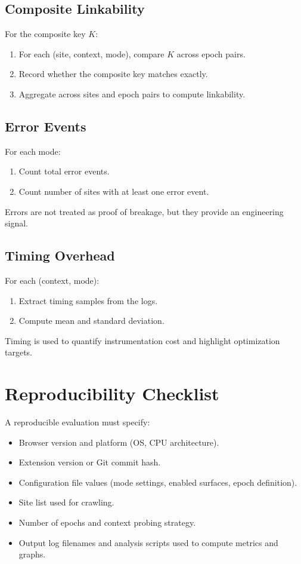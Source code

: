 \documentclass[11pt]{report}
\begin{document}
\subsection{Composite Linkability}

For the composite key $K$:
\begin{enumerate}
    \item For each (site, context, mode), compare $K$ across epoch pairs.
    \item Record whether the composite key matches exactly.
    \item Aggregate across sites and epoch pairs to compute linkability.
\end{enumerate}

\subsection{Error Events}

For each mode:
\begin{enumerate}
    \item Count total error events.
    \item Count number of sites with at least one error event.
\end{enumerate}

Errors are not treated as proof of breakage, but they provide an engineering signal.

\subsection{Timing Overhead}

For each (context, mode):
\begin{enumerate}
    \item Extract timing samples from the logs.
    \item Compute mean and standard deviation.
\end{enumerate}

Timing is used to quantify instrumentation cost and highlight optimization targets.

\section{Reproducibility Checklist}

A reproducible evaluation must specify:

\begin{itemize}
    \item Browser version and platform (OS, CPU architecture).
    \item Extension version or Git commit hash.
    \item Configuration file values (mode settings, enabled surfaces, epoch definition).
    \item Site list used for crawling.
    \item Number of epochs and context probing strategy.
    \item Output log filenames and analysis scripts used to compute metrics and graphs.
\end{itemize}
\end{document}
